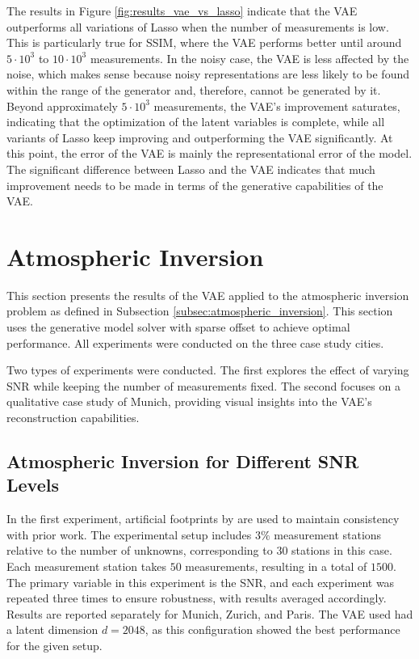 The results in Figure \ref{fig:results_vae_vs_lasso} indicate that the \gls{VAE} outperforms all variations of \gls{Lasso} when the number of measurements is low.
This is particularly true for \gls{SSIM}, where the \gls{VAE} performs better until around $5 \cdot 10^{3}$ to $10 \cdot 10^{3}$ measurements.
In the noisy case, the \gls{VAE} is less affected by the noise, which makes sense because noisy representations are less likely to be found within the range of the generator and, therefore, cannot be generated by it.
Beyond approximately $5 \cdot 10^{3}$ measurements, the \gls{VAE}'s improvement saturates, indicating that the optimization of the latent variables is complete, while all variants of \gls{Lasso} keep improving and outperforming the \gls{VAE} significantly.
At this point, the error of the \gls{VAE} is mainly the representational error of the model.
The significant difference between \gls{Lasso} and the \gls{VAE} indicates that much improvement needs to be made in terms of the generative capabilities of the \gls{VAE}.

\section{Atmospheric Inversion}\label{section:atmospheric_inversion_results}
This section presents the results of the \gls{VAE} applied to the atmospheric inversion problem as defined in Subsection \ref{subsec:atmospheric_inversion}.
This section uses the generative model solver with sparse offset to achieve optimal performance.
All experiments were conducted on the three case study cities.

Two types of experiments were conducted.
The first explores the effect of varying \gls{SNR} while keeping the number of measurements fixed.
The second focuses on a qualitative case study of Munich, providing visual insights into the \gls{VAE}'s reconstruction capabilities.

\subsection{Atmospheric Inversion for Different SNR Levels}
In the first experiment, artificial footprints by \textcite{UrbanSparseReconstructionFootprints} are used to maintain consistency with prior work.
The experimental setup includes $3\%$ measurement stations relative to the number of unknowns, corresponding to $30$ stations in this case.
Each measurement station takes $50$ measurements, resulting in a total of $1500$.
The primary variable in this experiment is the \gls{SNR}, and each experiment was repeated three times to ensure robustness, with results averaged accordingly.
Results are reported separately for Munich, Zurich, and Paris.
The \gls{VAE} used had a latent dimension $d = 2048$, as this configuration showed the best performance for the given setup.

